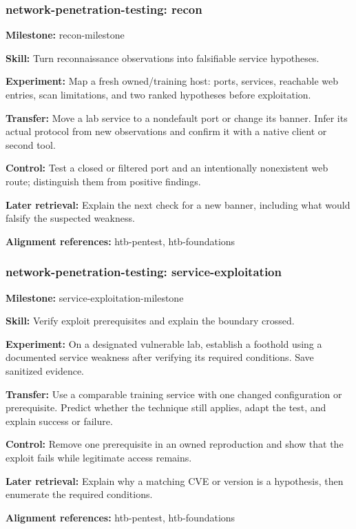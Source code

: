 \subsubsection{network-penetration-testing: recon}
\noindent\textbf{Milestone:} recon-milestone\par
\noindent\textbf{Skill:} Turn reconnaissance observations into falsifiable service hypotheses.\par
\noindent\textbf{Experiment:} Map a fresh owned/training host: ports, services, reachable web entries, scan limitations, and two ranked hypotheses before exploitation.\par
\noindent\textbf{Transfer:} Move a lab service to a nondefault port or change its banner. Infer its actual protocol from new observations and confirm it with a native client or second tool.\par
\noindent\textbf{Control:} Test a closed or filtered port and an intentionally nonexistent web route; distinguish them from positive findings.\par
\noindent\textbf{Later retrieval:} Explain the next check for a new banner, including what would falsify the suspected weakness.\par
\noindent\textbf{Alignment references:} htb-pentest, htb-foundations\par
\subsubsection{network-penetration-testing: service-exploitation}
\noindent\textbf{Milestone:} service-exploitation-milestone\par
\noindent\textbf{Skill:} Verify exploit prerequisites and explain the boundary crossed.\par
\noindent\textbf{Experiment:} On a designated vulnerable lab, establish a foothold using a documented service weakness after verifying its required conditions. Save sanitized evidence.\par
\noindent\textbf{Transfer:} Use a comparable training service with one changed configuration or prerequisite. Predict whether the technique still applies, adapt the test, and explain success or failure.\par
\noindent\textbf{Control:} Remove one prerequisite in an owned reproduction and show that the exploit fails while legitimate access remains.\par
\noindent\textbf{Later retrieval:} Explain why a matching CVE or version is a hypothesis, then enumerate the required conditions.\par
\noindent\textbf{Alignment references:} htb-pentest, htb-foundations\par
